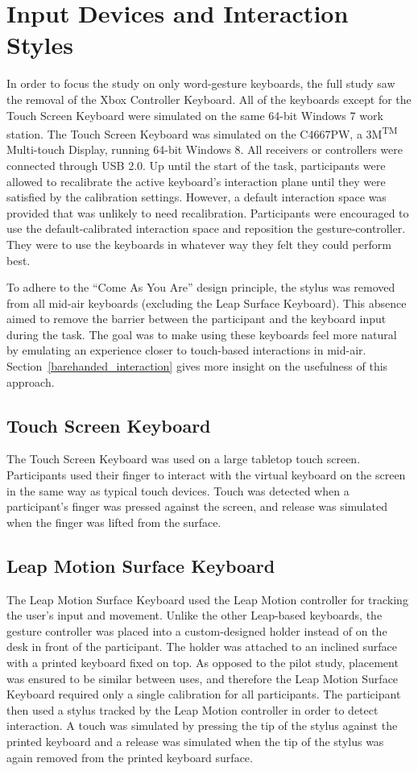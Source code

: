 \section{Input Devices and Interaction Styles} \label{final_devices}
In order to focus the study on only word-gesture keyboards, the full study saw the removal of the Xbox Controller Keyboard. All of the keyboards except for the Touch Screen Keyboard were simulated on the same 64-bit Windows 7 work station. The Touch Screen Keyboard was simulated on the C4667PW, a 3M\textsuperscript{TM} Multi-touch Display, running 64-bit Windows 8. All receivers or controllers were connected through USB 2.0. Up until the start of the task, participants were allowed to recalibrate the active keyboard's interaction plane until they were satisfied by the calibration settings. However, a default interaction space was provided that was unlikely to need recalibration. Participants were encouraged to use the default-calibrated interaction space and reposition the gesture-controller. They were to use the keyboards in whatever way they felt they could perform best.

To adhere to the ``Come As You Are'' design principle, the stylus was removed from all mid-air keyboards (excluding the Leap Surface Keyboard). This absence aimed to remove the barrier between the participant and the keyboard input during the task. The goal was to make using these keyboards feel more natural by emulating an experience closer to touch-based interactions in mid-air. Section~\ref{barehanded_interaction} gives more insight on the usefulness of this approach.

\subsection{Touch Screen Keyboard}
The Touch Screen Keyboard was used on a large tabletop touch screen. Participants used their finger to interact with the virtual keyboard on the screen in the same way as typical touch devices. Touch was detected when a participant's finger was pressed against the screen, and release was simulated when the finger was lifted from the surface.

\subsection{Leap Motion Surface Keyboard}
The Leap Motion Surface Keyboard used the Leap Motion controller for tracking the user's input and movement. Unlike the other Leap-based keyboards, the gesture controller was placed into a custom-designed holder instead of on the desk in front of the participant. The holder was attached to an inclined surface with a printed keyboard fixed on top. As opposed to the pilot study, placement was ensured to be similar between uses, and therefore the Leap Motion Surface Keyboard required only a single calibration for all participants. The participant then used a stylus tracked by the Leap Motion controller in order to detect interaction. A touch was simulated by pressing the tip of the stylus against the printed keyboard and a release was simulated when the tip of the stylus was again removed from the printed keyboard surface.

